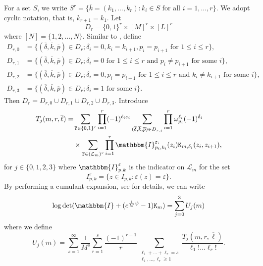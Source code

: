 \documentclass[11pt,twoside]{amsart}
\theoremstyle{plain}
\numberwithin{quest}{section}
\theoremstyle{remark}
\numberwithin{rem}{section}
\theoremstyle{definition}
\newcommand{\eps}{\varepsilon}
\begin{document}
For a set $S$, we write $S^r = \{\overline{k} = (k_1, \dots, k_r) : k_i \in S \text{ for all } i = 1, \dots, r\}$. We adopt cyclic notation, that is, $k_{r+1}=k_1$.
Let 
\begin{equation*}
	D_r=\{0,1\}^r \times [M]^r \times [L]^r
\end{equation*}
where $[N]=\{1,2,\dots, N\}$.  
Similar to \cite{BCJ18},
define
\begin{align*}
	D_{r,0} &= \{(\overline{\delta},\overline{k}, \overline{p}) \in D_r; \delta_i =0,k_i=k_{i+1},p_i=p_{i+1} \mbox{ for } 1\leq i \leq r\}, \\
	D_{r,1} &= \{(\overline{\delta},\overline{k}, \overline{p}) \in D_r; \delta_i =0 \mbox{ for } 1\leq i \leq r\mbox{ and } p_i \ne p_{i+1} \mbox{ for some $i$} \}, \\
		D_{r,2} &= \{ (\overline{\delta},\overline{k}, \overline{p}) \in D_r; \delta_i =0, p_i = p_{i+1}\mbox{~for~}1\leq i\leq r  \mbox{~and~} k_i\not=k_{i+1} \mbox{~for some~}i\}, \\
	D_{r,3} &= \{ (\overline{\delta},\overline{k}, \overline{p}) \in D_r; \delta_i =1  \mbox{~for some~} i \}.
\end{align*}
Then $D_r=D_{r,0}\cup D_{r,1}  \cup D_{r,2} \cup D_{r,3}$. Introduce
\begin{equation}  \label{Tjmrell}
	\begin{split}
		T_j(m,r,\overline{\ell}) = &\sum_{\overline{\eps} \in \{0,1\}^r}  \prod_{i=1}^r (-1)^{\ell_i \eps_i} \sum_{(\overline{\delta},\overline{k},\overline{p}) \in D_{r,j}} \prod_{i=1}^r \omega_{p_i}^{\ell_i} (-1)^{\delta_i}  \\
		&\times \sum_{\overline{z} \in( \mathcal{L}_m)^r } \prod_{i=1}^r \mathbbm{I}_{p_i, k_i}^{\eps_i} (z_i)
		\mathtt{K}_{m,\delta_i}(z_i,z_{i+1}),
	\end{split}
\end{equation}
for $j \in \{0,1,2,3\}$ where $\mathbbm{I}_{p,k}^{\eps}$ is the indicator on $\mathcal{L}_m$ for the set
\begin{equation}
	\label{E:Ipke}
	I_{p,k}^{\eps}=\{z \in I_{p,k}: \eps(z)=\eps\}.
\end{equation}
By performing a cumulant expansion, see \cite[Equations (4.1)-(4.6)]{BCJ18} for details, we can write
\begin{equation*}
	\log \det( \mathbbm{I} +(e^{\frac{1}{M} \psi}-1) \mathtt{K}_m) = \sum_{j=0 }^3 U_j(m)
\end{equation*}
where we define
\begin{equation} \label{Ujm}
	U_j(m)=  \sum_{s=1}^\infty \frac{1}{M^s} \sum_{r=1}^s \frac{(-1)^{r+1}}{r} \sum_{\substack{\ell_1+\dots+\ell_r=s \\ \ell_1,\dots,\ell_r \geq 1}} \frac{T_j(m,r,\overline{\ell})}{\ell_1! \dots \ell_r!}.
\end{equation}
\end{document}
